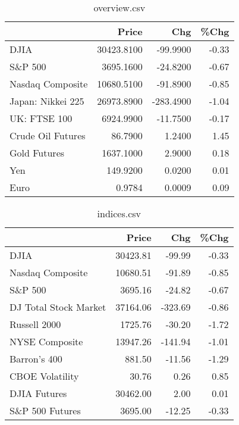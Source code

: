 \documentclass{article}%
\begin{document}
\begin{table}[htbp]%
\caption{overview.csv}%
\centering%
\begin{adjustbox}{width=1\textwidth}%
\begin{tabular}{lrrr}
\toprule
                  &      Price &       Chg &  \%Chg \\
\midrule
             DJIA & 30423.8100 &  -99.9900 & -0.33 \\
          S\&P 500 &  3695.1600 &  -24.8200 & -0.67 \\
 Nasdaq Composite & 10680.5100 &  -91.8900 & -0.85 \\
Japan: Nikkei 225 & 26973.8900 & -283.4900 & -1.04 \\
     UK: FTSE 100 &  6924.9900 &  -11.7500 & -0.17 \\
Crude Oil Futures &    86.7900 &    1.2400 &  1.45 \\
     Gold Futures &  1637.1000 &    2.9000 &  0.18 \\
              Yen &   149.9200 &    0.0200 &  0.01 \\
             Euro &     0.9784 &    0.0009 &  0.09 \\
\bottomrule
\end{tabular}
%
\end{adjustbox}%
\end{table}

%


\begin{table}[htbp]%
\caption{indices.csv}%
\centering%
\begin{adjustbox}{width=1\textwidth}%
\begin{tabular}{lrrr}
\toprule
                      &    Price &     Chg &  \%Chg \\
\midrule
                 DJIA & 30423.81 &  -99.99 & -0.33 \\
     Nasdaq Composite & 10680.51 &  -91.89 & -0.85 \\
              S\&P 500 &  3695.16 &  -24.82 & -0.67 \\
DJ Total Stock Market & 37164.06 & -323.69 & -0.86 \\
         Russell 2000 &  1725.76 &  -30.20 & -1.72 \\
       NYSE Composite & 13947.26 & -141.94 & -1.01 \\
         Barron's 400 &   881.50 &  -11.56 & -1.29 \\
      CBOE Volatility &    30.76 &    0.26 &  0.85 \\
         DJIA Futures & 30462.00 &    2.00 &  0.01 \\
      S\&P 500 Futures &  3695.00 &  -12.25 & -0.33 \\
\bottomrule
\end{tabular}
%
\end{adjustbox}%
\end{table}
\end{document}
